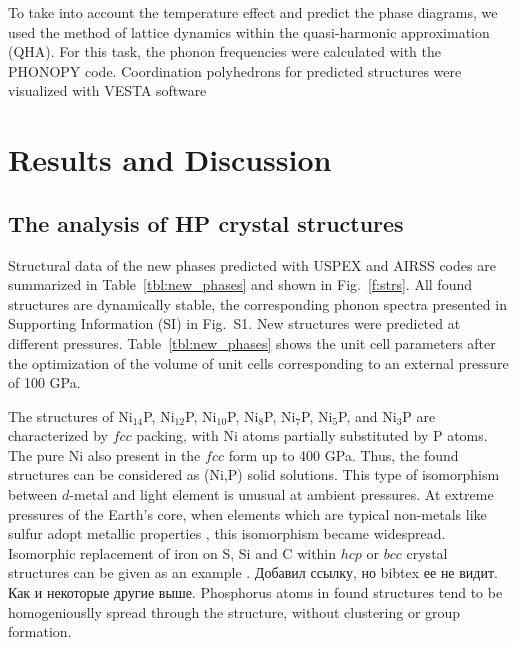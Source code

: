 \documentclass[twoside,twocolumn,9pt]{article}
\begin{document}
To take into account the temperature effect and predict the phase diagrams, we used the method of lattice dynamics within the quasi-harmonic approximation (QHA). 
For this task, the phonon frequencies were calculated with the PHONOPY code.\cite{phonopy}
{
\color{blue} Coordination polyhedrons for predicted structures were visualized with VESTA software~\cite{Momma:VESTA}
}




\section{Results and Discussion}

\subsection{The analysis of HP crystal structures}
Structural data of the new phases predicted with USPEX and AIRSS codes are summarized in Table~\ref{tbl:new_phases} and shown in Fig.~\ref{f:strs}. 
All found structures are dynamically stable, the corresponding phonon spectra presented in Supporting Information (SI) {\color{blue} in Fig.~S1.}
{\color{blue}
New structures were predicted at different pressures. 
Table~\ref{tbl:new_phases} shows the unit cell parameters after the optimization of the volume of unit cells corresponding to an external pressure of 100 GPa.
}

The structures of Ni$_{14}$P, Ni$_{12}$P, Ni$_{10}$P, Ni$_8$P, Ni$_7$P, Ni$_5$P, and Ni$_3$P are characterized by $fcc$ packing, with Ni atoms partially substituted by P atoms. 
The pure Ni also present in the $fcc$ form up to 400 GPa.
Thus, the found structures can be considered as (Ni,P) solid solutions.
This type of isomorphism between $d$-metal and light element is unusual at ambient pressures.
At extreme pressures of the Earth's core, when elements which are typical non-metals like sulfur adopt metallic properties \cite{gavr2017_s}, this isomorphism became widespread.
Isomorphic replacement of iron on S, Si and C within $hcp$ or $bcc$ crystal structures can be given as an example \cite{gavr2016_fes, LI2018118}.
{\color{blue} Добавил ссылку, но bibtex ее не видит. Как и некоторые другие выше. 
}
Phosphorus atoms in found structures tend to be homogeniouslly spread through the structure, without clustering or group formation.
\end{document}
